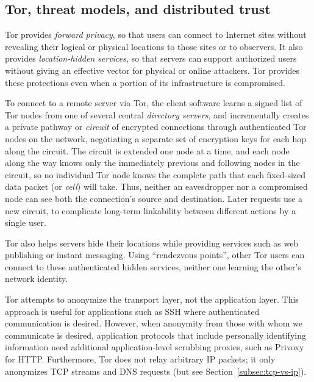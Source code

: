 \documentclass{llncs}
\begin{document}
\subsection{Tor, threat models, and distributed trust}
\label{sec:what-is-tor}


Tor provides \emph{forward privacy}, so that users can connect to
Internet sites without revealing their logical or physical locations
to those sites or to observers.  It also provides \emph{location-hidden
services}, so that servers can support authorized users without
giving an effective vector for physical or online attackers.
Tor provides these protections even when a portion of its
infrastructure is compromised.

To connect to a remote server via Tor, the client software learns a signed
list of Tor nodes from one of several central \emph{directory servers}, and
incrementally creates a private pathway or \emph{circuit} of encrypted
connections through authenticated Tor nodes on the network, negotiating a
separate set of encryption keys for each hop along the circuit.  The circuit
is extended one node at a time, and each node along the way knows only the
immediately previous and following nodes in the circuit, so no individual Tor
node knows the complete path that each fixed-sized data packet (or
\emph{cell}) will take.
Thus, neither an eavesdropper nor a compromised node can
see both the connection's source and destination.  Later requests use a new
circuit, to complicate long-term linkability between different actions by
a single user.

Tor also helps servers hide their locations while
providing services such as web publishing or instant
messaging.  Using ``rendezvous points'', other Tor users can
connect to these authenticated hidden services, neither one learning the
other's network identity.

Tor attempts to anonymize the transport layer, not the application layer.
This approach is useful for applications such as SSH
where authenticated communication is desired. However, when anonymity from
those with whom we communicate is desired,
application protocols that include personally identifying information need
additional application-level scrubbing proxies, such as
Privoxy~\cite{privoxy} for HTTP\@.  Furthermore, Tor does not relay arbitrary
IP packets; it only anonymizes TCP streams and DNS requests
(but see Section~\ref{subsec:tcp-vs-ip}).
\end{document}
